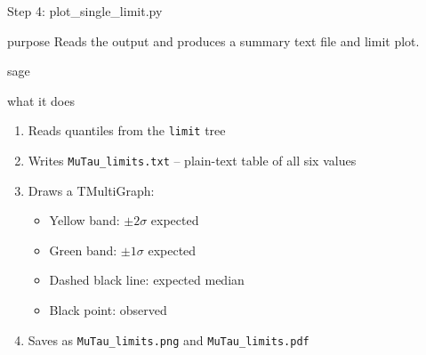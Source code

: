 \begin{frame}[fragile]{Step 4: plot\_single\_limit.py}
\protect{}\label{step-4-plot_single_limit.py}
\begin{block}{purpose}
\protect{}\label{purpose}
Reads the output and produces a summary text file and limit plot.
\end{block}

\begin{block}{sage}
\protect{}\label{sage}
\begin{Shaded}
\begin{Highlighting}[]
\DataTypeTok{\textbackslash{}}
\DataTypeTok{\textbackslash{}}
\end{Highlighting}
\end{Shaded}
\end{block}

\begin{block}{what it does}
\protect{}\label{what-it-does-1}
\begin{enumerate}
\tightlist
\item
  Reads quantiles from the \texttt{limit} tree
\item
  Writes \texttt{MuTau\_limits.txt} -- plain-text table of all six
  values
\item
  Draws a TMultiGraph:

  \begin{itemize}
  \tightlist
  \item
    Yellow band: \(\pm 2\sigma\) expected
  \item
    Green band: \(\pm 1\sigma\) expected
  \item
    Dashed black line: expected median
  \item
    Black point: observed
  \end{itemize}
\item
  Saves as \texttt{MuTau\_limits.png} and \texttt{MuTau\_limits.pdf}
\end{enumerate}
\end{block}
\end{frame}

